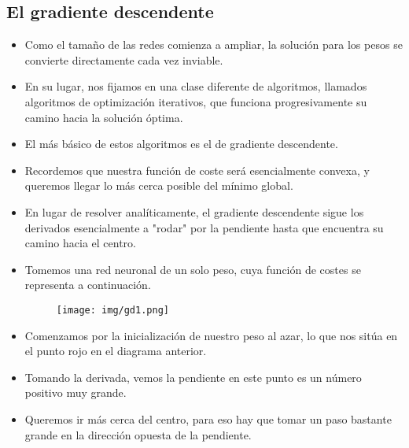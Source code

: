 \subsection{El gradiente descendente}
\begin{frame}{\titulo}{\subtitulo}
    \begin{itemize}
        \item Como el tamaño de las redes comienza a ampliar, la solución para los pesos se convierte directamente cada vez inviable.\bigskip

        \item En su lugar, nos fijamos en una clase diferente de algoritmos, llamados algoritmos de optimización iterativos, que funciona progresivamente su camino hacia la solución óptima.\bigskip

        \item El más básico de estos algoritmos es el de gradiente descendente.\bigskip

        \item Recordemos que nuestra función de coste será esencialmente convexa, y queremos llegar lo más cerca posible del mínimo global.\bigskip

        \item En lugar de resolver analíticamente, el gradiente descendente sigue los derivados esencialmente a "rodar" por la pendiente hasta que encuentra su camino hacia el centro.
    \end{itemize}
\end{frame}

\begin{frame}{\titulo}{\subtitulo}
    \begin{itemize}
        \item Tomemos una red neuronal de un solo peso, cuya función de costes se representa a continuación.
        \begin{figure}[H]
            \texttt{[image: img/gd1.png]}
        \end{figure}

        \item Comenzamos por la inicialización de nuestro peso al azar, lo que nos sitúa en el punto rojo en el diagrama anterior.\bigskip

        \item Tomando la derivada, vemos la pendiente en este punto es un número positivo muy grande.\bigskip

        \item Queremos ir más cerca del centro, para eso hay que tomar un paso bastante grande en la dirección opuesta de la pendiente.
    \end{itemize}
\end{frame}

